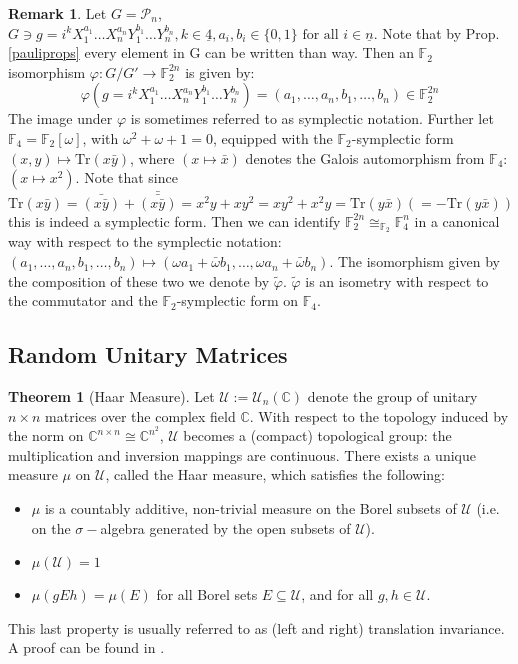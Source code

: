 \documentclass[12pt,a4paper,BCOR15mm,twoside,DIV12]{article}
\def\P{\mathcal{P}}
\def\F{\mathbb{F}}
\def\C{\mathbb{C}}
\def\U{\mathcal{U}}
\def\n{\underline{n}}
\def\fa{\text{ for all }}
\def\Tr{\text{Tr}}
\theoremstyle{definition}
\newtheorem{theorem}[Satz]{Theorem}
\newtheorem{rem}[Satz]{Remark}
\begin{document}
\begin{rem}\label{symplecticnotation}
Let $G = \P_n$, $G \ni g = i^k X_1^{a_1}\ldots X_n^{a_n} Y_1^{b_1} \ldots Y_n^{b_n}, k \in \underline{4}, a_i, b_i \in \{0,1\} \fa i \in \n$. Note that by Prop. \ref{pauliprops} every element in G can be written than way. Then an $\F_2$ isomorphism $\varphi : G/G' \rightarrow \F_2^{2n}$ is given by:
\[ \varphi (g = i^k X_1^{a_1}\ldots X_n^{a_n} Y_1^{b_1} \ldots Y_n^{b_n}) = (a_1, \ldots, a_n, b_1, \ldots, b_n) \in \F_2^{2n} \]
The image under $\varphi$ is sometimes referred to as symplectic notation.
Further let $\F_4 = \F_2[\omega]$, with $\omega^2 + \omega + 1 = 0$, equipped with the $\F_2$-symplectic form $ (x,y) \mapsto \Tr(x \bar y)$, where $ (x \mapsto \bar x)$ denotes the Galois automorphism from $\F_4$: $(x \mapsto x^2)$.
Note that since $\Tr(x \bar y) = \bar{(x \bar y)} + \bar{\bar{(x \bar y)}} = x^2y + xy^2 = xy^2 + x^2y = \Tr(y \bar x) (= - \Tr(y \bar x))$ this is indeed a symplectic form.
Then we can identify $\F_2^{2n} \cong_{\F_2} \F_4^n$ in a canonical way with respect to the symplectic notation: $(a_1, \ldots, a_n, b_1, \ldots, b_n) \mapsto (\omega a_1 + \bar \omega b_1, \ldots, \omega a_n + \bar \omega b_n)$. The isomorphism given by the composition of these two we denote by $\tilde \varphi$. $\tilde \varphi$ is an isometry with respect to the commutator and the $\F_2$-symplectic form on $\F_4$. 
\end{rem}



\subsection{Random Unitary Matrices}

\begin{theorem}[Haar Measure]
Let $\U := \U_n(\C)$ denote the group of unitary $n \times n$ matrices over the complex field $\C$. With respect to the topology induced by the norm on $\C^{n \times n} \cong \C^{n^2}$, $\U$ becomes a (compact) topological group:
the multiplication and inversion mappings are continuous. There exists a unique measure $\mu$ on $\U$, called the Haar measure, which satisfies the following:
\begin{itemize}
\item $\mu$ is a countably additive, non-trivial measure on the Borel subsets of $\U$ (i.e. on the $\sigma-$algebra generated by the open subsets of $\U$). 
\item $\mu(\U) = 1$
\item $\mu(gEh) = \mu(E)$ for all Borel sets $E \subseteq \U$, and for all $g,h \in \U$. 
\end{itemize}
 
This last property is usually referred to as (left and right) translation invariance.
A proof can be found in \cite{halmos}.
\end{theorem}
\end{document}
